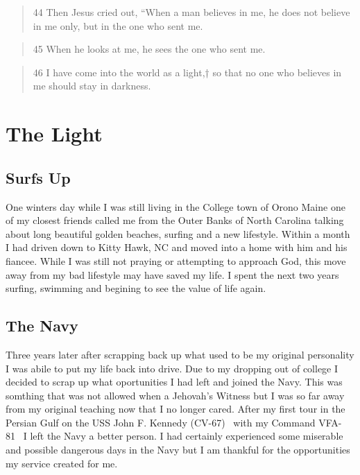 \documentclass[11pt,a4paper]{scrartcl} %
\begin{document}
\begin{verse}
44 Then Jesus cried out, “When a man believes in me, he does not believe in me only, but in the one who sent me.
\end{verse}
\begin{verse}
45 When he looks at me, he sees the one who sent me.
\end{verse}
\begin{verse}
 46 I have come into the world as a light,† so that no one who believes in me should stay in darkness. 
\end{verse}
\section{The Light}
\begin{doublespace}
\subsection{Surfs Up}
One winters day while I was still living in the College town of Orono Maine one of my closest friends called me from the Outer Banks of North Carolina talking about long beautiful golden beaches, surfing and a new lifestyle. Within a month I had driven down to Kitty Hawk, NC and moved into a home with him and his fiancee. While I was still not praying or attempting to approach God, this move away from my bad lifestyle may have saved my life. I spent the next two years surfing, swimming and begining to see the value of life again. 
\subsection{The Navy}
Three years later after scrapping back up what used to be my original personality I was abile to put my life back into drive. Due to my dropping out of college I decided to scrap up what oportunities I had left and joined the Navy. This was somthing that was not allowed when a Jehovah's Witness but I was so far away from my original teaching now that I no longer cared. After my first tour in the Persian Gulf on the USS John F. Kennedy (CV-67)~\cite{wiki:006} with my Command VFA-81~\cite{wiki:007} I left the Navy a better person. I had certainly experienced some miserable and possible dangerous days in the Navy but I am thankful for the opportunities my service created for me. 
\end{doublespace}
\begin{center}
\textcolor{Maroon}{}\\
\textcolor{brown}{}\\
\end{center}
\end{document}
